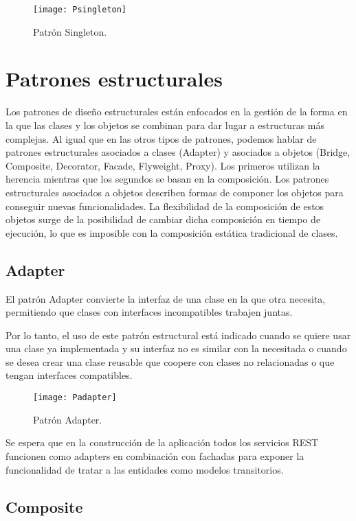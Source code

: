 \begin{figure}[H]
\centering
\texttt{[image: Psingleton]}
\caption{Patrón Singleton.}
\end{figure}


\section{Patrones estructurales}

Los patrones de diseño estructurales están enfocados en la gestión de la forma en la que las clases y los objetos se combinan para dar lugar a estructuras más complejas. Al igual que en las otros tipos de patrones, podemos hablar de patrones estructurales asociados a clases (Adapter) y asociados a objetos (Bridge, Composite, Decorator, Facade, Flyweight, Proxy). Los primeros utilizan la herencia mientras que los segundos se basan en la composición. Los patrones estructurales asociados a objetos describen formas de componer los objetos para conseguir nuevas funcionalidades. La flexibilidad de la composición de estos objetos surge de la posibilidad de cambiar dicha composición en tiempo de ejecución, lo que es imposible con la composición estática tradicional de clases.

\subsection{Adapter}

El patrón Adapter convierte la interfaz de una clase en la que otra necesita, permitiendo que clases con interfaces incompatibles trabajen juntas.

Por lo tanto, el uso de este patrón estructural está indicado cuando se quiere usar una clase ya implementada y su interfaz no es similar con la necesitada o cuando se desea crear una clase reusable que coopere con clases no relacionadas o que tengan interfaces compatibles.

\begin{figure}[H]
\centering
\texttt{[image: Padapter]}
\caption{Patrón Adapter.}
\end{figure}

Se espera que en la construcción de la aplicación todos los servicios REST funcionen como adapters en combinación con fachadas para exponer la funcionalidad de tratar a las entidades como modelos transitorios.

\subsection{Composite}

